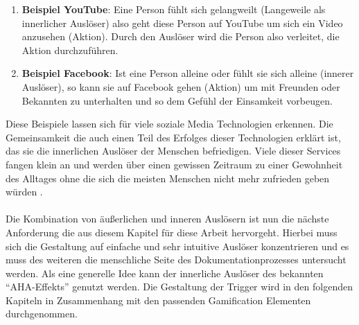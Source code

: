 \documentclass[a4paper,12pt,twoside]{scrartcl}
\begin{document}
\begin{enumerate}
      \item \textbf{Beispiel YouTube}: Eine Person fühlt sich gelangweilt (Langeweile als innerlicher Auslöser) also geht diese Person auf YouTube um sich ein Video anzusehen (Aktion). Durch den Auslöser wird die Person also verleitet, die Aktion durchzuführen. 
      \item \textbf{Beispiel Facebook}: Ist eine Person alleine oder fühlt sie sich alleine (innerer Auslöser), so kann sie auf Facebook gehen (Aktion) um mit Freunden oder Bekannten zu unterhalten und so dem Gefühl der Einsamkeit vorbeugen.
\end{enumerate}
Diese Beispiele lassen sich für viele soziale Media Technologien erkennen. Die Gemeinsamkeit die auch einen Teil des Erfolges dieser Technologien erklärt ist, das sie die innerlichen Auslöser der Menschen befriedigen. Viele dieser Services fangen klein an und werden über einen gewissen Zeitraum zu einer Gewohnheit des Alltages ohne die sich die meisten Menschen nicht mehr zufrieden geben würden \cite{Eyal2014}.
\\\\
Die Kombination von äußerlichen und inneren Auslösern ist nun die nächste Anforderung die aus diesem Kapitel für diese Arbeit hervorgeht. Hierbei muss sich die Gestaltung auf einfache und sehr intuitive Auslöser konzentrieren und es muss des weiteren die menschliche Seite des Dokumentationprozesses untersucht werden. Als eine generelle Idee kann der innerliche Auslöser des bekannten \enquote{AHA-Effekts} genutzt werden. Die Gestaltung der Trigger wird in den folgenden Kapiteln in Zusammenhang mit den passenden Gamification Elementen durchgenommen.  
\end{document}
